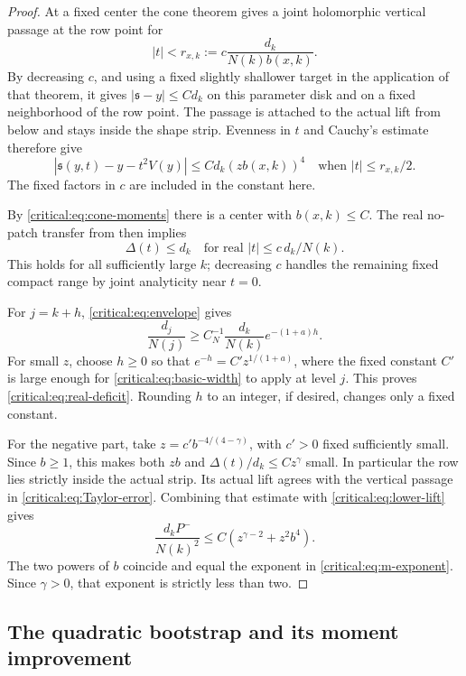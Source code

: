 \begin{proof}
At a fixed center the cone theorem gives a joint holomorphic vertical
passage at the row point for
\[
 |t|<r_{x,k}:=c\frac{d_k}{N(k)b(x,k)}.
\]
By decreasing \(c\), and using a fixed slightly shallower target in
the application of that theorem, it gives
\(|\mathfrak s-y|\le C d_k\) on this parameter disk and on a fixed
neighborhood of the row point. The passage is attached to the
actual lift from below and stays inside the shape strip. Evenness
in \(t\) and Cauchy's estimate therefore give
\begin{equation}\label{critical:eq:Taylor-error}
 \left|\mathfrak s(y,t)-y-t^2V(y)\right|
 \le C d_k(zb(x,k))^4
 \quad\text{when }|t|\le r_{x,k}/2.
\end{equation}
The fixed factors in \(c\) are included in the constant here.

By \eqref{critical:eq:cone-moments} there is a center with
\(b(x,k)\le C\). The real no-patch transfer from 
then implies
\begin{equation}\label{critical:eq:basic-width}
 \Delta(t)\le d_k
 \quad\text{for real }|t|\le c\,d_k/N(k).
\end{equation}
This holds for all sufficiently large \(k\); decreasing \(c\) handles
the remaining fixed compact range by joint analyticity near \(t=0\).

For \(j=k+h\), \eqref{critical:eq:envelope} gives
\[
 \frac{d_j}{N(j)}\ge C_N^{-1}
       \frac{d_k}{N(k)}e^{-(1+a)h}.
\]
For small \(z\), choose \(h\ge0\) so that
\(e^{-h}=C'z^{1/(1+a)}\), where the fixed constant \(C'\) is large
enough for \eqref{critical:eq:basic-width} to apply at level \(j\).
This proves \eqref{critical:eq:real-deficit}. Rounding \(h\) to an
integer, if desired, changes only a fixed constant.

For the negative part, take
\(z=c'b^{-4/(4-\gamma)}\), with \(c'>0\) fixed sufficiently small.
Since \(b\ge1\), this makes both \(zb\) and
\(\Delta(t)/d_k\le Cz^\gamma\) small. In particular the row lies
strictly inside the actual strip. Its actual lift agrees with the
vertical passage in \eqref{critical:eq:Taylor-error}. Combining that
estimate with \eqref{critical:eq:lower-lift} gives
\[
 \frac{d_kP^-}{N(k)^2}
 \le C\left(z^{\gamma-2}+z^2b^4\right).
\]
The two powers of \(b\) coincide and equal the exponent in
\eqref{critical:eq:m-exponent}. Since \(\gamma>0\), that exponent
is strictly less than two.
\end{proof}

\subsection{The quadratic bootstrap and its moment improvement}

